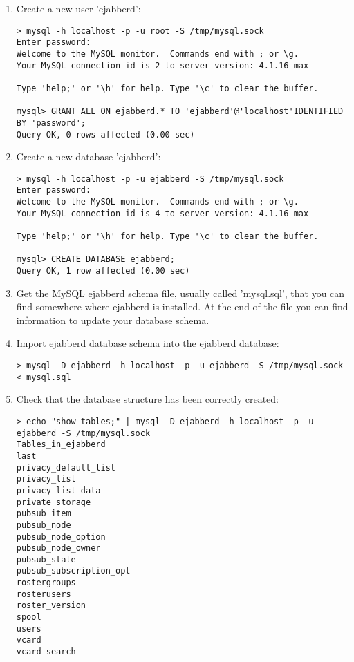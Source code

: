 \documentclass[a4paper,10pt]{book}
\begin{document}
\begin{enumerate}
\item Create a new user 'ejabberd':
\begin{verbatim}
> mysql -h localhost -p -u root -S /tmp/mysql.sock
Enter password:
Welcome to the MySQL monitor.  Commands end with ; or \g.
Your MySQL connection id is 2 to server version: 4.1.16-max

Type 'help;' or '\h' for help. Type '\c' to clear the buffer.

mysql> GRANT ALL ON ejabberd.* TO 'ejabberd'@'localhost'IDENTIFIED BY 'password';
Query OK, 0 rows affected (0.00 sec)
\end{verbatim}

\item Create a new database 'ejabberd':
\begin{verbatim}
> mysql -h localhost -p -u ejabberd -S /tmp/mysql.sock
Enter password:
Welcome to the MySQL monitor.  Commands end with ; or \g.
Your MySQL connection id is 4 to server version: 4.1.16-max

Type 'help;' or '\h' for help. Type '\c' to clear the buffer.

mysql> CREATE DATABASE ejabberd;
Query OK, 1 row affected (0.00 sec)
\end{verbatim}

\item Get the MySQL ejabberd schema file, usually called 'mysql.sql',
that you can find somewhere where ejabberd is installed. At the end
of the file you can find information to update your database schema.

\item Import ejabberd database schema into the ejabberd database:
\begin{verbatim}
> mysql -D ejabberd -h localhost -p -u ejabberd -S /tmp/mysql.sock < mysql.sql
\end{verbatim}

\item Check that the database structure has been correctly created:
\begin{verbatim}
> echo "show tables;" | mysql -D ejabberd -h localhost -p -u ejabberd -S /tmp/mysql.sock
Tables_in_ejabberd
last
privacy_default_list
privacy_list
privacy_list_data
private_storage
pubsub_item
pubsub_node
pubsub_node_option
pubsub_node_owner
pubsub_state
pubsub_subscription_opt
rostergroups
rosterusers
roster_version
spool
users
vcard
vcard_search
\end{verbatim}

\end{enumerate}
\end{document}
